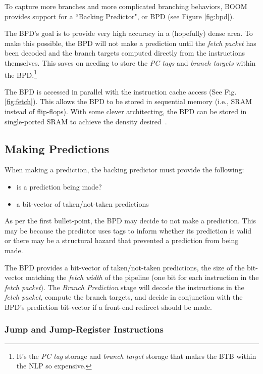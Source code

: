 To capture more branches and more complicated branching behaviors, BOOM provides support for a ``Backing Predictor", or BPD (see Figure \ref{fig:bpd}).

The BPD's goal is to provide very high accuracy in a (hopefully) dense area.  To make this possible, the BPD will not make a prediction until the {\em fetch packet} has been decoded and the branch targets computed directly from the instructions themselves.  This saves on needing to store the {\em PC tags} and {\em branch targets} within the BPD.\footnote{It's the {\em PC tag} storage and {\em branch target} storage that makes the BTB within the NLP so expensive.}

The BPD is accessed in parallel with the instruction cache access (See Fig. \ref{fig:fetch}).  This allows the BPD to be stored in sequential memory (i.e., SRAM instead of flip-flops). With some clever architecting, the BPD can be stored in single-ported SRAM to achieve the density desired~\cite{seznec2002design}.

\subsection{Making Predictions}

When making a prediction, the backing predictor must provide the following:

\begin{itemize}
\item is a prediction being made?
\item a bit-vector of taken/not-taken predictions
\end{itemize}

As per the first bullet-point, the BPD may decide to not make a prediction. This may be because the predictor uses tags to inform whether its prediction is valid or there may be a structural hazard that prevented a prediction from being made.

The BPD provides a bit-vector of taken/not-taken predictions, the size of the bit-vector matching the {\em fetch width} of the pipeline (one bit for each instruction in the {\em fetch packet}). The {\em Branch Prediction} stage will decode the instructions in the {\em fetch packet}, compute the branch targets, and decide in conjunction with the BPD's prediction bit-vector if a front-end redirect should be made. 

\subsubsection{Jump and Jump-Register Instructions}

